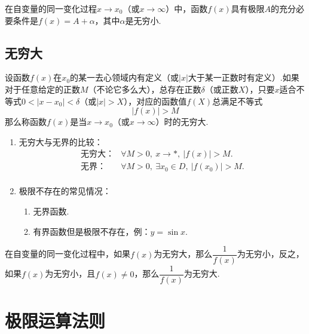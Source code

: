 \documentclass[lang=cn,10pt]{elegantbook}
\begin{document}
\begin{theorem}
	在自变量的同一变化过程\( x \to x_{0} \)（或\( x \to \infty \)）中，函数\( f(x) \)具有极限\( A \)的{\heiti 充分必要条件}是\( f(x) = A + \alpha \)，其中\( \alpha \)是无穷小.
\end{theorem}

\subsection{无穷大}

\begin{definition}[无穷大]
	设函数\( f(x) \)在\( x_{0} \)的某一去心领域内有定义（或\( |x| \)大于某一正数时有定义）.如果对于任意给定的正数\( M \)（不论它多么大），总存在正数\( \delta \)（或正数\( X \)），只要\( x \)适合不等式\( 0 < | x - x_{0} | < \delta \)（或\( |x| > X \)），对应的函数值\( f(X) \)总满足不等式
	\[ | f(x) | > M \]
	那么称函数\( f(x) \)是当\( x \to x_{0} \)（或\( x \to \infty \)）时的无穷大.
\end{definition}

\begin{note}
	\begin{enumerate}
		\item 无穷大与无界的比较：
		\[ \begin{array}{ll}
			\text{无穷大：} & \forall M > 0,\ x \to *,\ |f(x)| > M. \\
			\text{无界：}   & \forall M > 0,\ \exists x_{0} \in D,\ |f(x_{0})| > M. \\
		\end{array} \]
		\item 极限不存在的常见情况：
		\begin{enumerate}
			\item 无界函数.
			\item 有界函数但是极限不存在，例：\( y = \sin x \).
		\end{enumerate}
	\end{enumerate}
\end{note}

\begin{theorem}
	在自变量的同一变化过程中，如果\( f(x) \)为无穷大，那么\( \dfrac{1}{f(x)} \)为无穷小，反之，如果\( f(x) \)为无穷小，且\( f(x) \neq 0 \)，那么\( \dfrac{1}{f(x)} \)为无穷大.
\end{theorem}

\section{极限运算法则}
\end{document}
